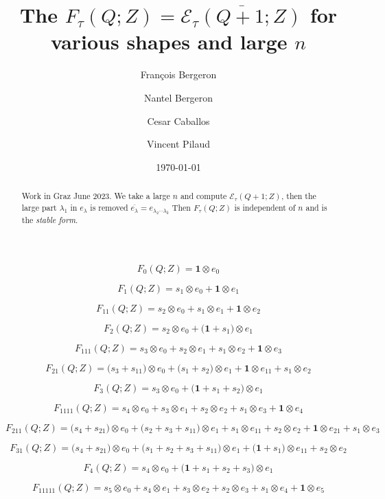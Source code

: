 \documentclass[12pt]{amsart}
\date{\today}
\author{Fran\c{c}ois Bergeron}
\author{Nantel Bergeron}
\author{Cesar Caballos}
\author{Vincent Pilaud}
\title{The $F_\tau(Q;Z)= \overline{{\mathcal E}_\tau(Q+1;Z)} $ for various shapes and large $n$}
\theoremstyle{plain}
\theoremstyle{definition}
\theoremstyle{remark}
\begin{document}
\begin{abstract}
Work in Graz June 2023. We take a large $n$ and compute ${\mathcal E}_\tau(Q+1;Z)$, then the large part $\lambda_1$ in $e_\lambda$ is removed $\overline{e_\lambda}=e_{\lambda_2\cdots\lambda_k}$
Then $F_\tau(Q;Z)$ is independent of $n$ and is the {\sl stable form}.
\end{abstract}

\maketitle


$$F_{ 0 }(Q;Z)=
\boldsymbol{1} \otimes e_{ 0 }
$$

$$F_{ 1 }(Q;Z)=
s_{1} \otimes e_{ 0 }
+ \boldsymbol{1} \otimes e_{ 1 }
$$

$$F_{ 11 }(Q;Z)=
s_{2} \otimes e_{ 0 }
+ s_{1} \otimes e_{ 1 }
+ \boldsymbol{1} \otimes e_{ 2 }
$$

$$F_{ 2 }(Q;Z)=
s_{2} \otimes e_{ 0 }
+\big( \boldsymbol{1} + s_{1} \big) \otimes e_{ 1 }
$$

$$F_{ 111 }(Q;Z)=
s_{3} \otimes e_{ 0 }
+ s_{2} \otimes e_{ 1 }
+ s_{1} \otimes e_{ 2 }
+ \boldsymbol{1} \otimes e_{ 3 }
$$

$$F_{ 21 }(Q;Z)=
\big( s_{3} + s_{11} \big) \otimes e_{ 0 }
+\big( s_{1} + s_{2} \big) \otimes e_{ 1 }
+ \boldsymbol{1} \otimes e_{ 11 }
+ s_{1} \otimes e_{ 2 }
$$

$$F_{ 3 }(Q;Z)=
s_{3} \otimes e_{ 0 }
+\big( \boldsymbol{1} + s_{1} + s_{2} \big) \otimes e_{ 1 }
$$

$$F_{ 1111 }(Q;Z)=
s_{4} \otimes e_{ 0 }
+ s_{3} \otimes e_{ 1 }
+ s_{2} \otimes e_{ 2 }
+ s_{1} \otimes e_{ 3 }
+ \boldsymbol{1} \otimes e_{ 4 }
$$

$$F_{ 211 }(Q;Z)=
\big( s_{4} + s_{21} \big) \otimes e_{ 0 }
+\big( s_{2} + s_{3} + s_{11} \big) \otimes e_{ 1 }
+ s_{1} \otimes e_{ 11 }
+ s_{2} \otimes e_{ 2 }
+ \boldsymbol{1} \otimes e_{ 21 }
+ s_{1} \otimes e_{ 3 }
$$

$$F_{ 31 }(Q;Z)=
\big( s_{4} + s_{21} \big) \otimes e_{ 0 }
+\big( s_{1} + s_{2} + s_{3} + s_{11} \big) \otimes e_{ 1 }
+\big( \boldsymbol{1} + s_{1} \big) \otimes e_{ 11 }
+ s_{2} \otimes e_{ 2 }
$$

$$F_{ 4 }(Q;Z)=
s_{4} \otimes e_{ 0 }
+\big( \boldsymbol{1} + s_{1} + s_{2} + s_{3} \big) \otimes e_{ 1 }
$$

$$F_{ 11111 }(Q;Z)=
s_{5} \otimes e_{ 0 }
+ s_{4} \otimes e_{ 1 }
+ s_{3} \otimes e_{ 2 }
+ s_{2} \otimes e_{ 3 }
+ s_{1} \otimes e_{ 4 }
+ \boldsymbol{1} \otimes e_{ 5 }
$$
\end{document}
